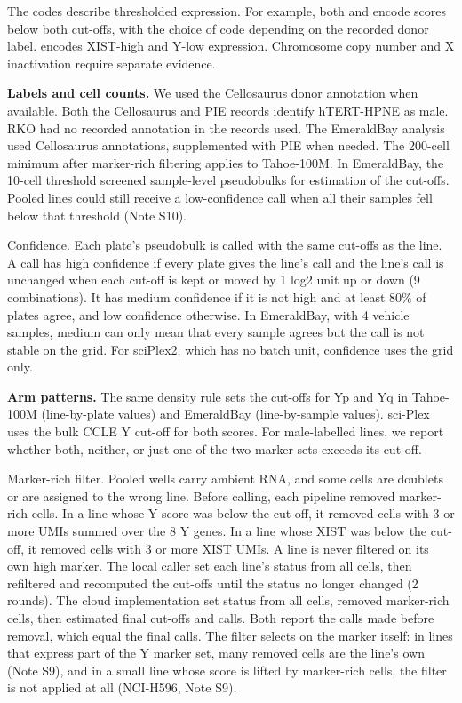 \documentclass[
  11pt,
  letterpaper,
]{article}
\begin{document}
The codes describe thresholded expression. For example, both
 and  encode scores below both cut-offs,
with the choice of code depending on the recorded donor label.
 encodes XIST-high and Y-low expression. Chromosome copy
number and X inactivation require separate evidence.

\textbf{Labels and cell counts.} We used the Cellosaurus donor
annotation when available. Both the Cellosaurus and PIE records identify
hTERT-HPNE as male. RKO had no recorded annotation in the records used.
The EmeraldBay analysis used Cellosaurus annotations, supplemented with
PIE when needed. The 200-cell minimum after marker-rich filtering
applies to Tahoe-100M. In EmeraldBay, the 10-cell threshold screened
sample-level pseudobulks for estimation of the cut-offs. Pooled lines
could still receive a low-confidence call when all their samples fell
below that threshold (Note S10).

Confidence. Each plate's pseudobulk is called with the same cut-offs as
the line. A call has high confidence if every plate gives the line's
call and the line's call is unchanged when each cut-off is kept or moved
by 1 log2 unit up or down (9 combinations). It has medium confidence if
it is not high and at least 80\% of plates agree, and low confidence
otherwise. In EmeraldBay, with 4 vehicle samples, medium can only mean
that every sample agrees but the call is not stable on the grid. For
sciPlex2, which has no batch unit, confidence uses the grid only.

\textbf{Arm patterns.} The same density rule sets the cut-offs for Yp
and Yq in Tahoe-100M (line-by-plate values) and EmeraldBay
(line-by-sample values). sci-Plex uses the bulk CCLE Y cut-off for both
scores. For male-labelled lines, we report whether both, neither, or
just one of the two marker sets exceeds its cut-off.

Marker-rich filter. Pooled wells carry ambient RNA, and some cells are
doublets or are assigned to the wrong line. Before calling, each
pipeline removed marker-rich cells. In a line whose Y score was below
the cut-off, it removed cells with 3 or more UMIs summed over the 8 Y
genes. In a line whose XIST was below the cut-off, it removed cells with
3 or more XIST UMIs. A line is never filtered on its own high marker.
The local caller set each line's status from all cells, then refiltered
and recomputed the cut-offs until the status no longer changed (2
rounds). The cloud implementation set status from all cells, removed
marker-rich cells, then estimated final cut-offs and calls. Both report
the calls made before removal, which equal the final calls. The filter
selects on the marker itself: in lines that express part of the Y marker
set, many removed cells are the line's own (Note S9), and in a small
line whose score is lifted by marker-rich cells, the filter is not
applied at all (NCI-H596, Note S9).
\end{document}
